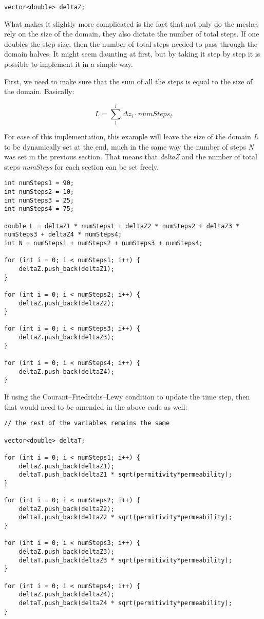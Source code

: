 \begin{verbatim}
vector<double> deltaZ;
\end{verbatim}

What makes it slightly more complicated is the fact that not only do the meshes rely on the size of the domain, they also dictate the number of total steps. If one doubles the step size, then the number of total steps needed to pass through the domain halves. It might seem daunting at first, but by taking it step by step it is possible to implement it in a simple way.

First, we need to make sure that the sum of all the steps is equal to the size of the domain. Basically:

$$L = \sum_{1}^{i} \Delta z_i \cdot numSteps_i$$

For ease of this implementation, this example will leave the size of the domain \textit{L} to be dynamically set at the end, much in the same way the number of steps \textit{N} was set in the previous section. That means that \textit{deltaZ} and the number of total steps \textit{numSteps} for each section can be set freely.

\begin{verbatim}
int numSteps1 = 90;
int numSteps2 = 10;
int numSteps3 = 25;
int numSteps4 = 75;

double L = deltaZ1 * numSteps1 + deltaZ2 * numSteps2 + deltaZ3 * numSteps3 + deltaZ4 * numSteps4;
int N = numSteps1 + numSteps2 + numSteps3 + numSteps4;

for (int i = 0; i < numSteps1; i++) {
	deltaZ.push_back(deltaZ1);
}

for (int i = 0; i < numSteps2; i++) {
	deltaZ.push_back(deltaZ2);
}

for (int i = 0; i < numSteps3; i++) {
	deltaZ.push_back(deltaZ3);
}

for (int i = 0; i < numSteps4; i++) {
	deltaZ.push_back(deltaZ4);
}
\end{verbatim}

If using the Courant–Friedrichs–Lewy condition to update the time step, then that would need to be amended in the above code as well:

\begin{verbatim}
// the rest of the variables remains the same

vector<double> deltaT;

for (int i = 0; i < numSteps1; i++) {
	deltaZ.push_back(deltaZ1);
	deltaT.push_back(deltaZ1 * sqrt(permitivity*permeability);
}

for (int i = 0; i < numSteps2; i++) {
	deltaZ.push_back(deltaZ2);
	deltaT.push_back(deltaZ2 * sqrt(permitivity*permeability);
}

for (int i = 0; i < numSteps3; i++) {
	deltaZ.push_back(deltaZ3);
	deltaT.push_back(deltaZ3 * sqrt(permitivity*permeability);
}

for (int i = 0; i < numSteps4; i++) {
	deltaZ.push_back(deltaZ4);
	deltaT.push_back(deltaZ4 * sqrt(permitivity*permeability);
}
\end{verbatim}

